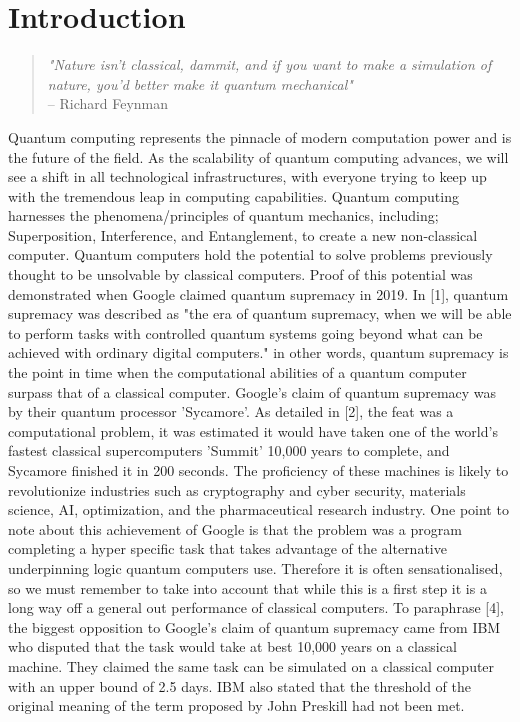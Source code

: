 \chapter{Introduction}


\begin{quote}
\textit{"Nature isn't classical, dammit, and if you want to make a simulation of nature, you'd better make it quantum mechanical"}  \\
\hfill -- Richard Feynman
\end{quote}


\noindent Quantum computing represents the pinnacle of modern computation power and is the future of the field. As the scalability of quantum computing advances, we will see a shift in all technological infrastructures, with everyone trying to keep up with the tremendous leap in computing capabilities. Quantum computing harnesses the phenomena/principles of quantum mechanics, including; Superposition, Interference, and Entanglement, to create a new non-classical computer. Quantum computers hold the potential to solve problems previously thought to be unsolvable by classical computers. Proof of this potential was demonstrated when Google claimed quantum supremacy in 2019. In [1], quantum supremacy was described as "the era of quantum supremacy, when we will be able to perform tasks with controlled quantum systems going beyond what can be achieved with ordinary digital computers." in other words, quantum supremacy is the point in time when the computational abilities of a quantum computer surpass that of a classical computer. Google's claim of quantum supremacy was by their quantum processor 'Sycamore'. As detailed in [2], the feat was a computational problem, it was estimated it would have taken one of the world's fastest classical supercomputers 'Summit' 10,000 years to complete, and Sycamore finished it in 200 seconds. The proficiency of these machines is likely to revolutionize industries such as cryptography and cyber security, materials science, AI, optimization, and the pharmaceutical research industry. One point to note about this achievement of Google is that the problem was a program completing a hyper specific task that takes advantage of the alternative underpinning logic quantum computers use. Therefore it is often sensationalised, so we must remember to take into account that while this is a first step it is a long way off a general out performance of classical computers. To paraphrase [4], the biggest opposition to Google's claim of quantum supremacy came from IBM who disputed that the task would take at best 10,000 years on a classical machine. They claimed the same task can be simulated on a classical computer with an upper bound of 2.5 days. IBM also stated that the threshold of the original meaning of the term proposed by John Preskill had not been met.

